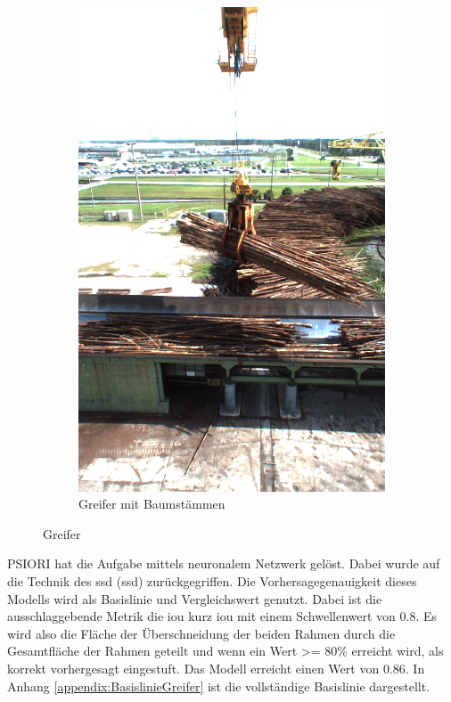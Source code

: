 \begin{figure}[h]
\begin{subfigure}[c]{0.49\textwidth}
			\label{img:Grapple}	
		\end{subfigure}
		\begin{subfigure}[c]{0.49\textwidth}			
			\includegraphics[width=1\textwidth, center]{bilder/Grundlagen/Logs_14.png}
			\caption[Bsp. Bild: Greifer mit Baumstämmen]{Greifer mit Baumstämmen}
			\label{img:Logs}	
		\end{subfigure}
		\caption{Greifer}
		\label{img:Greifer}
	\end{figure}	

	PSIORI hat die Aufgabe mittels neuronalem Netzwerk gelöst. Dabei wurde auf die Technik des \acl{ssd} (\ac{ssd}) \cite{Liu.2015} zurückgegriffen. Die Vorhersagegenauigkeit dieses Modells wird als Basislinie und Vergleichswert genutzt. Dabei ist die ausschlaggebende Metrik die  \acl{iou} kurz \ac{iou} mit einem Schwellenwert von 0.8. Es wird also die Fläche der Überschneidung der beiden Rahmen durch die Gesamtfläche der Rahmen geteilt und wenn ein Wert >= 80\% erreicht wird, als korrekt vorhergesagt eingestuft.  Das Modell erreicht einen Wert von $0.86$. In Anhang \ref{appendix:BasislinieGreifer} ist die vollständige Basislinie dargestellt.
	
